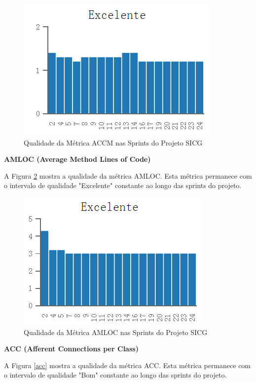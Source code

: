 \begin{figure}[H]
		\centering
			\includegraphics[scale=1.0]{figuras/accm.png}
		\caption{Qualidade da Métrica ACCM nas Sprints do Projeto SICG}
		\label{accm}
\end{figure}

\textbf{AMLOC (Average Method Lines of Code)}

A Figura \ref{amloc} mostra a qualidade da métrica AMLOC. Esta métrica permanece com o intervalo de qualidade "Excelente" constante ao longo das sprints do projeto.

\begin{figure}[H]
		\centering
			\includegraphics[scale=1.0]{figuras/amloc.png}
		\caption{Qualidade da Métrica AMLOC nas Sprints do Projeto SICG}
		\label{amloc}
\end{figure}

\textbf{ACC (Afferent Connections per Class)}

A Figura \ref{acc} mostra a qualidade da métrica ACC. Esta métrica permanece com o intervalo de qualidade "Bom" constante ao longo das sprints do projeto.

